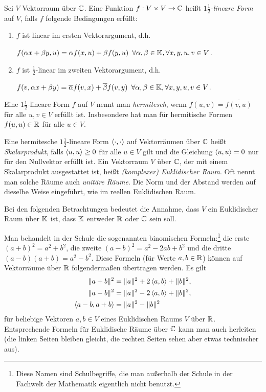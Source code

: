 Sei $ V $ Vektorraum über $ \mathbb C $. Eine Funktion $ f : V \times V \to \mathbb C $ heißt \emph{$ 1\frac{1}{2} $-lineare Form} auf $ V $, falls $ f $ folgende Bedingungen erfüllt:
\begin{enumerate}
	\item
		$ f $ ist linear im ersten Vektorargument, d.h.
		
		$ f(\alpha x + \beta y, u) = \alpha f(x,u) + \beta f(y,u) \enspace \forall \alpha, \beta \in \mathbb K, \forall x,y,u,v \in V $.
	\item
		$ f $ ist $ \frac{1}{2} $-linear im zweiten Vektorargument, d.h.
		
		$ f(v, \alpha x + \beta y) = \overline{\alpha} f(v,x) + \overline{\beta} f(v,y) \enspace \forall \alpha, \beta \in \mathbb K, \forall x,y,u,v \in V $.
\end{enumerate}
Eine $ 1\frac{1}{2} $-lineare Form $ f $ auf $ V $ nennt man \emph{hermitesch}, wenn $ f(u,v) = \overline{f(v,u)} $ für alle $u,v \in V$ erfüllt ist. Insbesondere hat man für hermitische Formen $ f(u,u) \in \mathbb R $ für alle $u \in V$. 

Eine hermitesche $ 1\frac{1}{2} $-lineare Form $ \left\langle \cdot,\cdot \right\rangle $ auf Vektorräumen über $ \mathbb C $ heißt \emph{Skalarprodukt}, falls $ \left\langle u,u \right\rangle \geq 0$ für alle $u \in V$ gilt und die Gleichung $ \left\langle u,u \right\rangle = 0 $ nur für den Nullvektor erfüllt ist. Ein Vektorraum $ V $ über $ \mathbb C $, der mit einem Skalarprodukt ausgestattet ist, heißt \emph{(komplexer) Euklidischer Raum}. Oft nennt man solche Räume auch \emph{unitäre Räume}. Die Norm und der Abstand werden auf dieselbe Weise eingeführt, wie im reellen Euklidischen Raum.

%
\begin{framed}
Bei den folgenden Betrachtungen bedeutet die Annahme, dass $ V $ ein Euklidischer Raum über $ \mathbb K $ ist, dass $ \mathbb K $ entweder $ \mathbb R $ oder $ \mathbb C $ sein soll.
\end{framed} 

\begin{bem}
Man behandelt in der Schule die sogenannten binomischen Formeln:\footnote{Diese Namen sind Schulbegriffe, die man außerhalb der Schule in der Fachwelt der Mathematik eigentlich nicht benutzt.} die erste $(a+b)^2 = a^2 + b^2$, die zweite $(a-b)^2 = a^2 - 2 a b + b^2$ und die dritte $(a-b)(a+b) = a^2 - b^2$. Diese Formeln (für Werte $a,b \in \mathbb R$) können auf Vektorräume über $\mathbb R$ folgendermaßen übertragen werden. Es gilt 
\begin{align*}
	\|a  + b\|^2 & = \|a\|^2 + 2 \left\langle a,b \right\rangle + \|b\|^2,
\\	\|a-b\|^2 & = \|a\|^2 - 2 \left\langle a,b \right\rangle + \|b\|^2, 
\\ \left\langle a-b,a+b \right\rangle & = \|a\|^2 - \|b\|^2
\end{align*}
für beliebige Vektoren $a,b \in V$ eines Euklidischen Raums $V$ über $\mathbb R$.   Entsprechende Formeln für Euklidische Räume über $\mathbb C$ kann man auch herleiten (die linken Seiten bleiben gleicht, die rechten Seiten sehen aber etwas technischer aus). 
\end{bem} 

